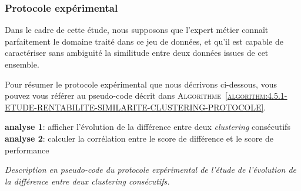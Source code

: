 		\subsubsection{Protocole expérimental}
			
			\begin{leftBarWarning}
				Dans le cadre de cette étude, nous supposons que l'expert métier connaît parfaitement le domaine traité dans ce jeu de données, et qu'il est capable de caractériser sans ambiguïté la similitude entre deux données issues de cet ensemble.
			\end{leftBarWarning}
			
			Pour résumer le protocole expérimental que nous décrivons ci-dessous, vous pouvez vous référer au pseudo-code décrit dans \textsc{Algorithme~\ref{algorithm:4.5.1-ETUDE-RENTABILITE-SIMILARITE-CLUSTERING-PROTOCOLE}}.
			
			\begin{algorithm}
				\textbf{analyse 1}: afficher l'évolution de la différence entre deux \textit{clustering} consécutifs \;
				\textbf{analyse 2}: calculer la corrélation entre le score de différence et le score de performance \;
				\caption{\textit{Description en pseudo-code du protocole expérimental de l'étude de l'évolution de la différence entre deux \textit{clustering} consécutifs.}}
				\label{algorithm:4.5.1-ETUDE-RENTABILITE-SIMILARITE-CLUSTERING-PROTOCOLE}
			\end{algorithm}

